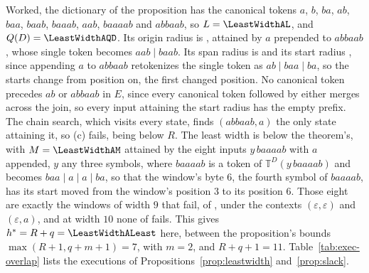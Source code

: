 \documentclass[11pt,a4paper]{article}
\theoremstyle{definition}
\theoremstyle{plain}
\newcommand{\T}{\mathbb{T}}
\begin{document}
Worked, the dictionary of the proposition has the canonical tokens \(a\), \(b\), \(ba\), \(ab\), \(baa\), \(baab\),
\(baaab\), \(aab\), \(baaaab\) and \(abbaab\), so \(L = \LeastWidthAL\), and \(Q(D) = \LeastWidthAQD\). Its origin
radius is \LeastWidthAR{}, attained by \(a\) prepended to \(abbaab\), whose single token becomes \(aab \mid baab\). Its
span radius is \LeastWidthAQspan{} and its start radius \LeastWidthAQstart{}, since appending \(a\) to \(abbaab\)
retokenizes the single token as \(ab \mid baa \mid ba\), so the starts change from position \LeastWidthAAttaining{} on,
the first changed position. No canonical token precedes \(ab\) or \(abbaab\) in \(E\), since every canonical token
followed by either merges across the join, so every input attaining the start radius has the empty prefix. The chain
search, which visits every state, finds \((abbaab, a)\) the only state attaining it, so (c) fails,
\LeastWidthAAttaining{} being below \(R\). The least width is \LeastWidthASlack{} below the theorem's, with
\(M = \LeastWidthAM\) attained by the eight inputs \(y\,baaaab\) with \(a\) appended, \(y\) any three symbols, where
\(baaaab\) is a token of \(\T^D(y\,baaaab)\) and becomes \(baa \mid a \mid a \mid ba\), so that the window's byte \(6\),
the fourth symbol of \(baaaab\), has its start moved from the window's position \(3\) to its position \(6\). Those eight
are exactly the windows of width \(9\) that fail, \LeastWidthAFailNine{} of \LeastWidthAWindowsNine{}, under the
contexts \((\varepsilon, \varepsilon)\) and \((\varepsilon, a)\), and at width \(10\) none of \LeastWidthAWindowsTen{}
fails. This gives \(h^* = R + q = \LeastWidthALeast\) here, between the proposition's bounds
\(\max(R + 1, q + m + 1) = 7\), with \(m = 2\), and \(R + q + 1 = 11\). Table~\ref{tab:exec-overlap} lists the
executions of Propositions~\ref{prop:leastwidth} and~\ref{prop:slack}.

\end{document}
